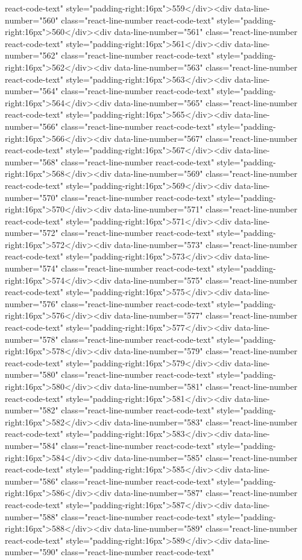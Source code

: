 react-code-text" style="padding-right:16px">559</div><div data-line-number="560" class="react-line-number react-code-text" style="padding-right:16px">560</div><div data-line-number="561" class="react-line-number react-code-text" style="padding-right:16px">561</div><div data-line-number="562" class="react-line-number react-code-text" style="padding-right:16px">562</div><div data-line-number="563" class="react-line-number react-code-text" style="padding-right:16px">563</div><div data-line-number="564" class="react-line-number react-code-text" style="padding-right:16px">564</div><div data-line-number="565" class="react-line-number react-code-text" style="padding-right:16px">565</div><div data-line-number="566" class="react-line-number react-code-text" style="padding-right:16px">566</div><div data-line-number="567" class="react-line-number react-code-text" style="padding-right:16px">567</div><div data-line-number="568" class="react-line-number react-code-text" style="padding-right:16px">568</div><div data-line-number="569" class="react-line-number react-code-text" style="padding-right:16px">569</div><div data-line-number="570" class="react-line-number react-code-text" style="padding-right:16px">570</div><div data-line-number="571" class="react-line-number react-code-text" style="padding-right:16px">571</div><div data-line-number="572" class="react-line-number react-code-text" style="padding-right:16px">572</div><div data-line-number="573" class="react-line-number react-code-text" style="padding-right:16px">573</div><div data-line-number="574" class="react-line-number react-code-text" style="padding-right:16px">574</div><div data-line-number="575" class="react-line-number react-code-text" style="padding-right:16px">575</div><div data-line-number="576" class="react-line-number react-code-text" style="padding-right:16px">576</div><div data-line-number="577" class="react-line-number react-code-text" style="padding-right:16px">577</div><div data-line-number="578" class="react-line-number react-code-text" style="padding-right:16px">578</div><div data-line-number="579" class="react-line-number react-code-text" style="padding-right:16px">579</div><div data-line-number="580" class="react-line-number react-code-text" style="padding-right:16px">580</div><div data-line-number="581" class="react-line-number react-code-text" style="padding-right:16px">581</div><div data-line-number="582" class="react-line-number react-code-text" style="padding-right:16px">582</div><div data-line-number="583" class="react-line-number react-code-text" style="padding-right:16px">583</div><div data-line-number="584" class="react-line-number react-code-text" style="padding-right:16px">584</div><div data-line-number="585" class="react-line-number react-code-text" style="padding-right:16px">585</div><div data-line-number="586" class="react-line-number react-code-text" style="padding-right:16px">586</div><div data-line-number="587" class="react-line-number react-code-text" style="padding-right:16px">587</div><div data-line-number="588" class="react-line-number react-code-text" style="padding-right:16px">588</div><div data-line-number="589" class="react-line-number react-code-text" style="padding-right:16px">589</div><div data-line-number="590" class="react-line-number react-code-text" 